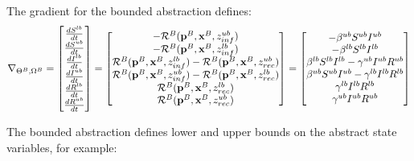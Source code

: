 \begin{example}
    The gradient for the bounded abstraction defines:
    \begin{eqnarray}
        \nabla_{\Theta^B, \Omega^B} = \begin{bmatrix} \frac{dS^{lb}}{dt}\\
                \frac{dS^{ub}}{dt}\\
                \frac{dI^{lb}}{dt}\\
                \frac{dI^{ub}}{dt}\\
                \frac{dR^{lb}}{dt}\\
                \frac{dR^{ub}}{dt} \end{bmatrix} = \begin{bmatrix} -{\cal
            R}^{B}({\bf p}^B, {\bf x}^B, z_{inf}^{ub})\\
            -{\cal R}^{B}({\bf p}^B, {\bf x}^B, z_{inf}^{lb})\\
             {\cal R}^{B}({\bf p}^B, {\bf x}^B, z_{inf}^{lb}) - {\cal
             R}^{B}({\bf p}^B, {\bf x}^B, z_{rec}^{ub})\\
             {\cal R}^{B}({\bf p}^B, {\bf x}^B, z_{inf}^{ub}) - {\cal
             R}^{B}({\bf p}^B, {\bf x}^B, z_{rec}^{lb})\\
             {\cal R}^{B}({\bf p}^B, {\bf x}^B, z_{rec}^{lb})\\
             {\cal R}^{B}({\bf p}^B, {\bf x}^B, z_{rec}^{ub}) \end{bmatrix} =
    \begin{bmatrix} -\beta^{ub} S^{ub} I^{ub}\\
        -\beta^{lb} S^{lb} I^{lb}\\
        \beta^{lb} S^{lb} I^{lb}-\gamma^{ub} I^{ub} R^{ub}\\
        \beta^{ub} S^{ub} I^{ub}-\gamma^{lb} I^{lb} R^{lb}\\
        \gamma^{lb} I^{lb} R^{lb}\\
        \gamma^{ub} I^{ub} R^{ub}
    \end{bmatrix} 
   \end{eqnarray}

\end{example}

The bounded abstraction defines lower and upper bounds on the abstract state variables, for example:

